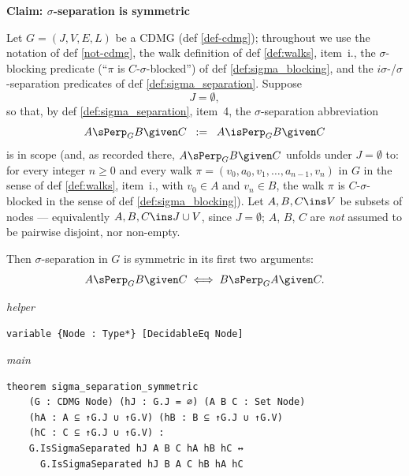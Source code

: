 \noindent\textbf{Claim: $\sigma$-separation is symmetric}\par\smallskip
{\appendixTexSize
\def\rowref{claim\_3\_22}
\label{claim_3_22}

\begin{Lem}\label{lem:sigma_separation_symmetric}
    Let $G = (J, V, E, L)$ be a CDMG (def \ref{def-cdmg}); throughout we use the notation of def \ref{not-cdmg}, the walk definition of def \ref{def:walks}, item~i., the $\sigma$-blocking predicate (``$\pi$ is $C$-$\sigma$-blocked'') of def \ref{def:sigma_blocking}, and the $i\sigma$-/$\sigma$-separation predicates of def \ref{def:sigma_separation}. Suppose
    \[
        J = \emptyset,
    \]
    so that, by def \ref{def:sigma_separation}, item~4, the $\sigma$-separation abbreviation
    \[
        A \sPerp_G B \given C \;\; := \;\; A \isPerp_G B \given C
    \]
    is in scope (and, as recorded there, $A \sPerp_G B \given C$ unfolds under $J = \emptyset$ to: for every integer $n \ge 0$ and every walk $\pi = (v_0, a_0, v_1, \dots, a_{n-1}, v_n)$ in $G$ in the sense of def \ref{def:walks}, item~i., with $v_0 \in A$ and $v_n \in B$, the walk $\pi$ is $C$-$\sigma$-blocked in the sense of def \ref{def:sigma_blocking}).
    Let $A, B, C \ins V$ be subsets of nodes --- equivalently $A, B, C \ins J \cup V$, since $J = \emptyset$; $A$, $B$, $C$ are \emph{not} assumed to be pairwise disjoint, nor non-empty.

    Then $\sigma$-separation in $G$ is symmetric in its first two arguments:
    \[
        A \sPerp_G B \given C \iff B \sPerp_G A \given C.
    \]
\end{Lem}
\par}
\smallskip
{\small\textit{helper}}
\begin{verbatim}
variable {Node : Type*} [DecidableEq Node]
\end{verbatim}
{\small\textit{main}}
\begin{verbatim}
theorem sigma_separation_symmetric
    (G : CDMG Node) (hJ : G.J = ∅) (A B C : Set Node)
    (hA : A ⊆ ↑G.J ∪ ↑G.V) (hB : B ⊆ ↑G.J ∪ ↑G.V)
    (hC : C ⊆ ↑G.J ∪ ↑G.V) :
    G.IsSigmaSeparated hJ A B C hA hB hC ↔
      G.IsSigmaSeparated hJ B A C hB hA hC
\end{verbatim}
~%

\vspace{\appendixNotesGap}

